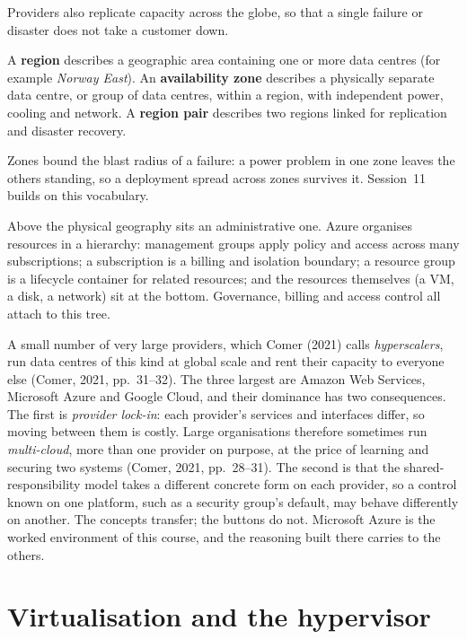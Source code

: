 Providers also replicate capacity across the globe, so that a single failure
or disaster does not take a customer down.

\begin{definition}\label{def:regions}
A \textbf{region} describes a geographic area containing one or more data
centres (for example \emph{Norway East}). An \textbf{availability zone}
describes a physically separate data centre, or group of data centres, within
a region, with independent power, cooling and network. A \textbf{region pair}
describes two regions linked for replication and disaster recovery.
\end{definition}

Zones bound the blast radius of a failure: a power problem in one zone leaves
the others standing, so a deployment spread across zones survives it.
Session~11 builds on this vocabulary.

Above the physical geography sits an administrative one. Azure organises
resources in a hierarchy: management groups apply policy and access across
many subscriptions; a subscription is a billing and isolation boundary; a
resource group is a lifecycle container for related resources; and the
resources themselves (a VM, a disk, a network) sit at the bottom.
Governance, billing and access control all attach to this tree.

A small number of very large providers, which Comer (2021) calls
\emph{hyperscalers}, run data centres of this kind at global scale and rent
their capacity to everyone else (Comer, 2021, pp.~31--32). The three largest
are Amazon Web Services, Microsoft Azure and Google Cloud, and their
dominance has two consequences. The first is \emph{provider lock-in}: each
provider's services and interfaces differ, so moving between them is costly.
Large organisations therefore sometimes run \emph{multi-cloud}, more than
one provider on purpose, at the price of learning and securing two systems
(Comer, 2021, pp.~28--31). The second is that the shared-responsibility
model takes a different concrete form on each provider, so a control known
on one platform, such as a security group's default, may behave differently
on another. The concepts transfer; the buttons do not. Microsoft Azure is
the worked environment of this course, and the reasoning built there
carries to the others.

\section{Virtualisation and the hypervisor}
\label{sec:virtualisation}

